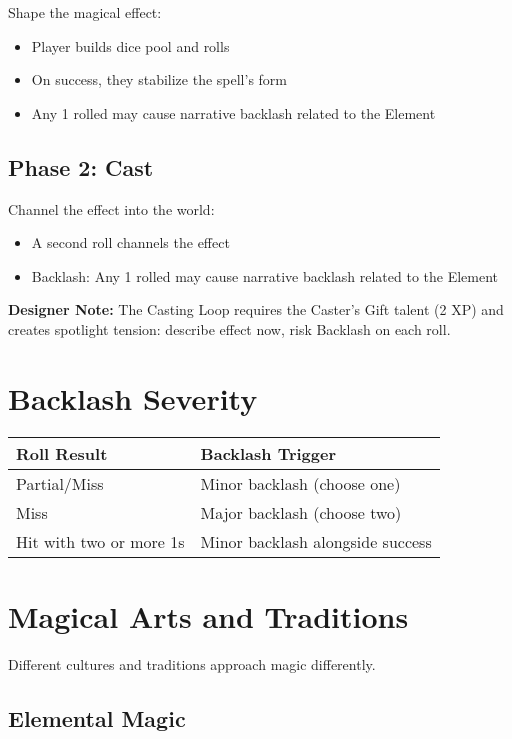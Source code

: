 \documentclass[11pt,twoside,openany]{book}
\begin{document}
Shape the magical effect:
\begin{itemize}
\item Player builds dice pool and rolls
\item On success, they stabilize the spell's form
\item Any 1 rolled may cause narrative backlash related to the Element
\end{itemize}

\subsection*{Phase 2: Cast}

Channel the effect into the world:
\begin{itemize}
\item A second roll channels the effect
\item Backlash: Any 1 rolled may cause narrative backlash related to the Element
\end{itemize}

\textbf{Designer Note:} The Casting Loop requires the Caster's Gift talent (2 XP) and creates spotlight tension: describe effect now, risk Backlash on each roll.

\section*{Backlash Severity} 

\begin{center}
\begin{tabular}{|l|l|}
\hline
\textbf{Roll Result} & \textbf{Backlash Trigger} \\
\hline
Partial/Miss & Minor backlash (choose one) \\
Miss & Major backlash (choose two) \\
Hit with two or more 1s & Minor backlash alongside success \\
\hline
\end{tabular}
\end{center}

\section*{Magical Arts and Traditions} 

Different cultures and traditions approach magic differently.

\subsection*{Elemental Magic}
\end{document}
